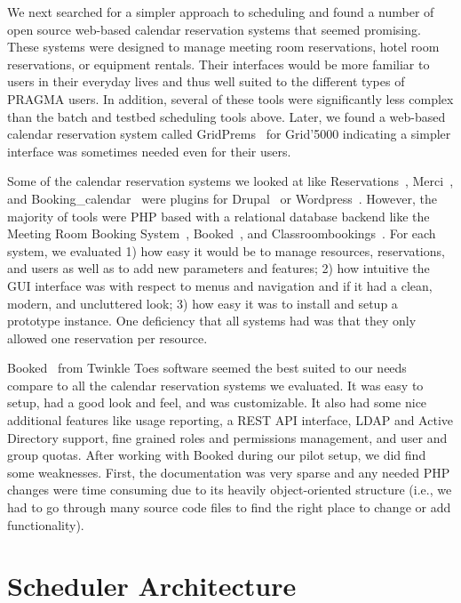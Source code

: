 \documentclass{acm_proc_article-sp}
\begin{document}
We next searched for a simpler approach to scheduling and found a number of open source web-based calendar reservation systems that seemed promising.  These systems were designed to manage meeting room reservations, hotel room reservations, or equipment rentals.   Their interfaces would be more familiar to users in their everyday lives and thus well suited to the different types of PRAGMA users.  In addition, several of these tools were significantly less complex than the batch and testbed scheduling tools above.  Later, we found a web-based calendar reservation system called GridPrems~\cite{gridprems} for Grid'5000 indicating a simpler interface was sometimes needed even for their users.

Some of the calendar reservation systems we looked at like Reservations~\cite{drupalreservations}, Merci~\cite{merci}, and Booking\_calendar~\cite{wordpressbooking} were plugins for Drupal~\cite{drupal} or Wordpress~\cite{wordpress}.  However, the majority of tools were PHP based with a relational database backend like the Meeting Room Booking System~\cite{mrbs}, Booked~\cite{booked}, and Classroombookings~\cite{classroombookings}.  For each system, we evaluated 1) how easy it would be to manage resources, reservations, and users as well as to add new parameters and features; 2) how intuitive the GUI interface was with respect to menus and navigation and if it had a clean, modern, and uncluttered look; 3)  how easy it was to install and setup a prototype instance. One deficiency that all systems had was that they only allowed one reservation per resource.

Booked~\cite{booked} from Twinkle Toes software seemed the best suited to our needs compare to all the calendar reservation systems we evaluated.  It was easy to setup, had  a good look and feel, and was customizable.  It also had some nice additional features like usage reporting, a REST API interface, LDAP and Active Directory support, fine grained roles and permissions management, and user and group quotas.  After working with Booked during our pilot setup, we did find some weaknesses.  First, the documentation was very sparse and any needed PHP changes were time consuming due to its heavily object-oriented structure (i.e., we had to go through many source code files to find the right place to change  or add functionality). 


\section{Scheduler Architecture}
\label{Sec:Arch}
\end{document}

